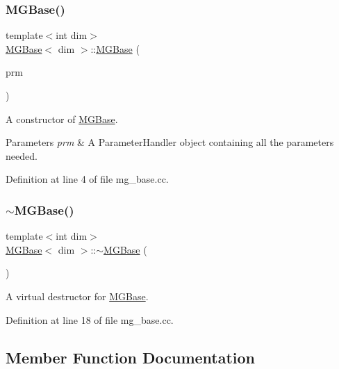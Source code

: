 \subsubsection{\texorpdfstring{M\+G\+Base()}{MGBase()}}
{\footnotesize\ttfamily template$<$int dim$>$ \\
\hyperlink{class_m_g_base}{M\+G\+Base}$<$ dim $>$\+::\hyperlink{class_m_g_base}{M\+G\+Base} (\begin{DoxyParamCaption}\item[{const Parameter\+Handler \&}]{prm }\end{DoxyParamCaption})}

A constructor of \hyperlink{class_m_g_base}{M\+G\+Base}.


\begin{DoxyParams}{Parameters}
{\em prm} & A Parameter\+Handler object containing all the parameters needed. \\
\hline
\end{DoxyParams}


Definition at line 4 of file mg\+\_\+base.\+cc.

\mbox{\label{class_m_g_base_a011e50e1caf44cfa3335b95d161ba14d}} 
\subsubsection{\texorpdfstring{$\sim$\+M\+G\+Base()}{~MGBase()}}
{\footnotesize\ttfamily template$<$int dim$>$ \\
\hyperlink{class_m_g_base}{M\+G\+Base}$<$ dim $>$\+::$\sim$\hyperlink{class_m_g_base}{M\+G\+Base} (\begin{DoxyParamCaption}{ }\end{DoxyParamCaption})\hspace{0.3cm}{\ttfamily [virtual]}}



A virtual destructor for \hyperlink{class_m_g_base}{M\+G\+Base}. 



Definition at line 18 of file mg\+\_\+base.\+cc.



\subsection{Member Function Documentation}
\mbox{\label{class_m_g_base_a3586c47d901608bc42792c6de456b1cb}} 
